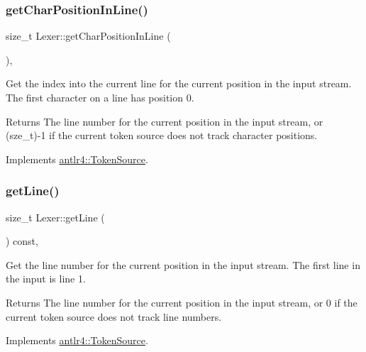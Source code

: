 \subsubsection{\texorpdfstring{get\+Char\+Position\+In\+Line()}{getCharPositionInLine()}}
{\footnotesize\ttfamily size\+\_\+t Lexer\+::get\+Char\+Position\+In\+Line (\begin{DoxyParamCaption}{ }\end{DoxyParamCaption})\hspace{0.3cm}{\ttfamily [override]}, {\ttfamily [virtual]}}



Get the index into the current line for the current position in the input stream. The first character on a line has position 0. 

\begin{DoxyReturn}{Returns}
The line number for the current position in the input stream, or (sze\+\_\+t)-\/1 if the current token source does not track character positions. 
\end{DoxyReturn}


Implements \hyperlink{classantlr4_1_1TokenSource_a69822a3dcbce1bd4ca407626a2420e4d}{antlr4\+::\+Token\+Source}.

\mbox{\label{classantlr4_1_1Lexer_a8ecc41ff09e40b469e519ed1b0d0912a}} 
\subsubsection{\texorpdfstring{get\+Line()}{getLine()}}
{\footnotesize\ttfamily size\+\_\+t Lexer\+::get\+Line (\begin{DoxyParamCaption}{ }\end{DoxyParamCaption}) const\hspace{0.3cm}{\ttfamily [override]}, {\ttfamily [virtual]}}



Get the line number for the current position in the input stream. The first line in the input is line 1. 

\begin{DoxyReturn}{Returns}
The line number for the current position in the input stream, or 0 if the current token source does not track line numbers. 
\end{DoxyReturn}


Implements \hyperlink{classantlr4_1_1TokenSource_a3b5d8cfd192fd9b9e4518010e600c714}{antlr4\+::\+Token\+Source}.

